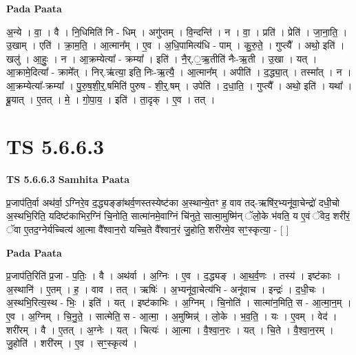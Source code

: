 \documentclass[17pt]{extarticle}
\begin{document}
\textbf{Pada Paata} \newline

अ॒न्ये । वा॒ । वै । नि॒धिमिति॑ नि - धिम् । अगु॑प्तम् । वि॒न्दन्ति॑ । न । वा॒ । प्रति॑ । प्रेति॑ । जा॒ना॒ति॒ । उ॒खाम् । एति॑ । क्रा॒म॒ति॒ । आ॒त्मान᳚म् । ए॒व । अ॒धि॒पामित्य॑धि - पाम् । कु॒रु॒ते॒ । गुप्त्यै᳚ । अथो॒ इति॑ । खलु॑ । आ॒हुः॒ । न । आ॒क्रम्येत्या᳚ - क्रम्या᳚ । इति॑ । नै॒र्.॒ऋ॒तीति॑ नैः-ऋ॒ती । उ॒खा । यत् । आ॒क्रामे॒दित्या᳚ - क्रामे᳚त् । निर्.ऋ॑त्या॒ इति॒ निः-ऋ॒त्यै॒ । आ॒त्मान᳚म् । अपीति॑ । द॒द्ध्या॒त् । तस्मा᳚त् । न । आ॒क्रम्येत्या᳚-क्रम्या᳚ । पु॒रु॒ष॒शी॒र्॒.षमिति॑ पुरुष - शी॒र्॒.षम् । उपेति॑ । द॒धा॒ति॒ । गुप्त्यै᳚ । अथो॒ इति॑ । यथा᳚ । ब्रू॒यात् । ए॒तत् । मे॒ । गो॒पा॒य॒ । इति॑ । ता॒दृक् । ए॒व । तत् ।  \newline





\section{ TS 5.6.6.3 }

\textbf{TS 5.6.6.3 } \newline
\textbf{Samhita Paata} \newline

प्र॒जाप॑ति॒र्वा अथ॑र्वा॒ ऽग्निरे॒व द॒द्ध्यङ्ङा॑थर्व॒णस्तस्येष्ट॑का अ॒स्थान्ये॒तꣳ ह॒ वाव तद्-ऋषि॑र॒भ्यनू॑वा॒चेन्द्रो॑ दधी॒चो अ॒स्थभि॒रिति॒ यदिष्ट॑काभिर॒ग्निं चि॒नोति॒ सात्मा॑नमे॒वाग्निं चि॑नुते॒ सात्मा॒मुष्मि॑न् ॅलो॒के भ॑वति॒ य ए॒वं ॅवेद॒ शरी॑रं॒ ॅवा ए॒तद॒ग्नेर्यच्चित्य॑ आ॒त्मा वै᳚श्वान॒रो यच्चि॒ते वै᳚श्वान॒रं जु॒होति॒ शरी॑रमे॒व सꣳ॒॒स्कृत्या॒ - [  ] \newline

\textbf{Pada Paata} \newline

प्र॒जाप॑ति॒रिति॑ प्र॒जा - प॒तिः॒ । वै । अथ॑र्वा । अ॒ग्निः । ए॒व । द॒द्ध्यङ् । आ॒थ॒र्व॒णः । तस्य॑ । इष्ट॑काः । अ॒स्थानि॑ । ए॒तम् । ह॒ । वाव । तत् । ऋषिः॑ । अ॒भ्यनू॑वा॒चेत्य॑भि - अनू॑वाच । इन्द्रः॑ । द॒धी॒चः । अ॒स्थभि॒रित्य॒स्थ - भिः॒ । इति॑ । यत् । इष्ट॑काभिः । अ॒ग्निम् । चि॒नोति॑ । सात्मा॑न॒मिति॒ स - आ॒त्मा॒न॒म् । ए॒व । अ॒ग्निम् । चि॒नु॒ते॒ । सात्मेति॒ स - आ॒त्मा॒ । अ॒मुष्मिन्न्॑ । लो॒के । भ॒व॒ति॒ । यः । ए॒वम् । वेद॑ । शरी॑रम् । वै । ए॒तत् । अ॒ग्नेः । यत् । चित्यः॑ । आ॒त्मा । वै॒श्वा॒न॒रः । यत् । चि॒ते । वै॒श्वा॒न॒रम् । जु॒होति॑ । शरी॑रम् । ए॒व । सꣳ॒॒स्कृत्य॑ ।  \newline
\end{document}
